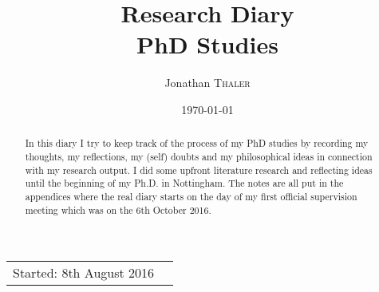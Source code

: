 \documentclass{article}
\title{Research Diary \\ PhD Studies} %
\author{Jonathan \textsc{Thaler}} %
\date{\today} %
\begin{document}
\maketitle %

\begin{center}
\begin{tabular}{l r}
Started: 8th August 2016
\end{tabular}
\end{center}

\begin{abstract}
In this diary I try to keep track of the process of my PhD studies by recording my thoughts, my reflections, my (self) doubts and my philosophical ideas in connection with my research output. I did some upfront literature research and reflecting ideas until the beginning of my Ph.D. in Nottingham. The notes are all put in the appendices where the real diary starts on the day of my first official supervision meeting which was on the 6th October 2016.
\end{abstract}





\newpage




\newpage

\appendix

\newpage


\newpage


\newpage

\end{document}
